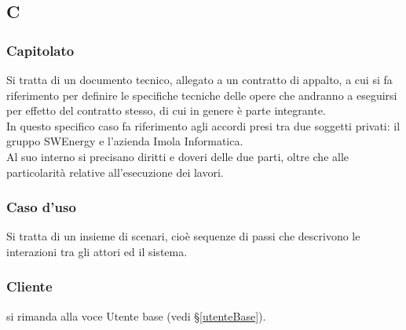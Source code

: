 \subsection{C}

\subsubsection{Capitolato}
Si tratta di un documento tecnico, allegato a un contratto di appalto, a cui si
fa riferimento per definire le specifiche tecniche delle opere che andranno a
eseguirsi per effetto del contratto stesso, di cui in genere è parte integrante.\\
In questo specifico caso fa riferimento agli accordi presi tra due soggetti
privati: il gruppo SWEnergy e l'azienda Imola Informatica. \\
Al suo interno si precisano diritti e doveri delle due parti, oltre che alle
particolarità relative all'esecuzione dei lavori.

\subsubsection{Caso d'uso}
Si tratta di un insieme di scenari, cioè sequenze di passi che descrivono le
interazioni tra gli attori ed il sistema.

\subsubsection{Cliente} si rimanda alla voce Utente base (vedi \S\ref{utenteBase}).

\newpage
